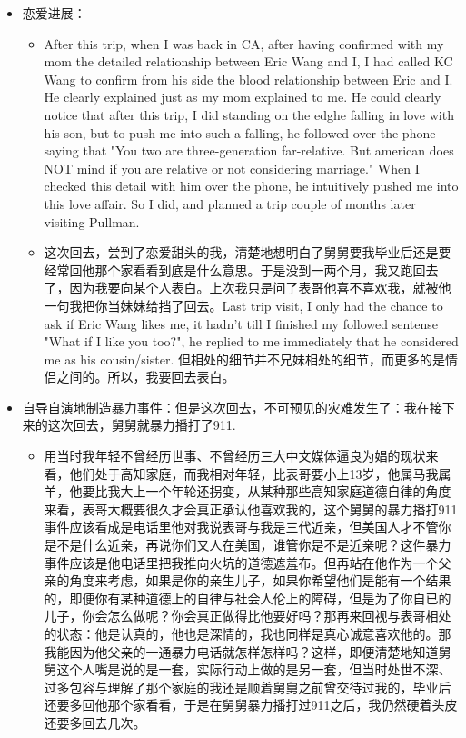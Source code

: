 \documentclass[9pt, b5paper]{article}
\begin{document}
\begin{itemize}
\begin{itemize}
\begin{itemize}
\end{itemize}
\item 恋爱进展：
\begin{itemize}
\item After this trip, when I was back in CA, after having confirmed with my mom the detailed relationship between Eric Wang and I, I had called KC Wang to confirm from his side the blood relationship between Eric and I. He clearly explained just as my mom explained to me. He could clearly notice that after this trip, I did standing on the edghe falling in love with his son, but to push me into such a falling, he followed over the phone saying that "You two are three-generation far-relative. But american does NOT mind if you are relative or not considering marriage." When I checked this detail with him over the phone, he intuitively pushed me into this love affair. So I did, and planned a trip couple of months later visiting Pullman.
\item 这次回去，尝到了恋爱甜头的我，清楚地想明白了舅舅要我毕业后还是要经常回他那个家看看到底是什么意思。于是没到一两个月，我又跑回去了，因为我要向某个人表白。上次我只是问了表哥他喜不喜欢我，就被他一句我把你当妹妹给挡了回去。Last trip visit, I only had the chance to ask if Eric Wang likes me, it hadn't till I finished my followed sentense "What if I like you too?", he replied to me immediately that he considered me as his cousin/sister. 但相处的细节并不兄妹相处的细节，而更多的是情侣之间的。所以，我要回去表白。
\end{itemize}
\item 自导自演地制造暴力事件：但是这次回去，不可预见的灾难发生了：我在接下来的这次回去，舅舅就暴力播打了911.
\begin{itemize}
\item 用当时我年轻不曾经历世事、不曾经历三大中文媒体逼良为娼的现状来看，他们处于高知家庭，而我相对年轻，比表哥要小上13岁，他属马我属羊，他要比我大上一个年轮还拐变，从某种那些高知家庭道德自律的角度来看，表哥大概要很久才会真正承认他喜欢我的，这个舅舅的暴力播打911事件应该看成是电话里他对我说表哥与我是三代近亲，但美国人才不管你是不是什么近亲，再说你们又人在美国，谁管你是不是近亲呢？这件暴力事件应该是他电话里把我推向火坑的道德遮羞布。但再站在他作为一个父亲的角度来考虑，如果是你的亲生儿子，如果你希望他们是能有一个结果的，即便你有某种道德上的自律与社会人伦上的障碍，但是为了你自已的儿子，你会怎么做呢？你会真正做得比他要好吗？那再来回视与表哥相处的状态：他是认真的，他也是深情的，我也同样是真心诚意喜欢他的。那我能因为他父亲的一通暴力电话就怎样怎样吗？这样，即便清楚地知道舅舅这个人嘴是说的是一套，实际行动上做的是另一套，但当时处世不深、过多包容与理解了那个家庭的我还是顺着舅舅之前曾交待过我的，毕业后还要多回他那个家看看，于是在舅舅暴力播打过911之后，我仍然硬着头皮还要多回去几次。

\end{itemize}
\end{itemize}
\end{itemize}
\end{document}
